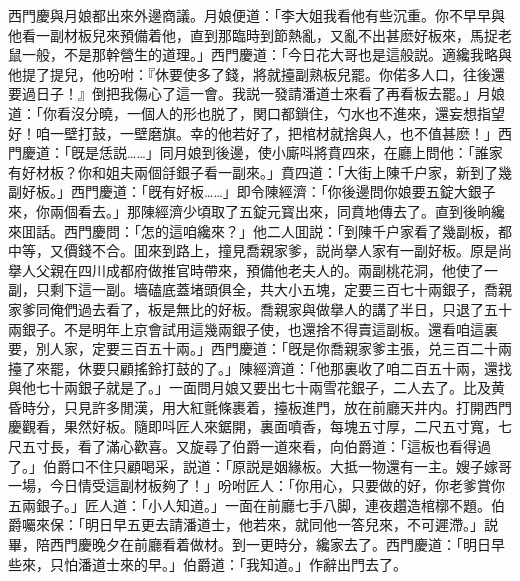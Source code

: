 西門慶與月娘都出來外邊商議。月娘便道：「李大姐我看他有些沉重。你不早早與他看一副材板兒來預備着他，直到那臨時到節熱亂，又亂不出甚麽好板來，馬捉老鼠一般，不是那幹營生的道理。」西門慶道：「今日花大哥也是這般説。適纔我略與他提了提兒，他吩咐：『休要使多了錢，將就擡副熟板兒罷。你偌多人口，往後還要過日子！』倒把我傷心了這一會。我説一發請潘道士來看了再看板去罷。」月娘道：「你看沒分曉，一個人的形也脱了，関口都鎖住，勺水也不進來，還妄想指望好！咱一壁打鼓，一壁磨旗。幸的他若好了，把棺材就捨與人，也不值甚麽！」西門慶道：「旣是恁説……」同月娘到後邊，使小廝呌將賁四來，在廳上問他：「誰家有好材板？你和姐夫兩個㧱銀子看一副來。」賁四道：「大街上陳千户家，新到了幾副好板。」西門慶道：「旣有好板……」即令陳經濟：「你後邊問你娘要五錠大銀子來，你兩個看去。」那陳經濟少頃取了五錠元寳出來，同賁地傳去了。直到後晌纔來囬話。西門慶問：「怎的這咱纔來？」他二人囬説：「到陳千户家看了幾副板，都中等，又價錢不合。囬來到路上，撞見喬親家爹，説尚擧人家有一副好板。原是尚擧人父親在四川成都府做推官時帶來，預備他老夫人的。兩副桃花洞，他使了一副，只剩下這一副。墻磕底蓋堵頭俱全，共大小五塊，定要三百七十兩銀子，喬親家爹同俺們過去看了，板是無比的好板。喬親家與做擧人的講了半日，只退了五十兩銀子。不是明年上京會試用這幾兩銀子使，也還捨不得賣這副板。還看咱這裏要，別人家，定要三百五十兩。」西門慶道：「旣是你喬親家爹主張，兑三百二十兩擡了來罷，休要只顧搖鈴打鼓的了。」陳經濟道：「他那裏收了咱二百五十兩，還找與他七十兩銀子就是了。」一面問月娘又要出七十兩雪花銀子，二人去了。比及黄昏時分，只見許多閒漢，用大紅氈條裹着，擡板進門，放在前廳天井内。打開西門慶觀看，果然好板。隨即呌匠人來鋸開，裏面噴香，每塊五寸厚，二尺五寸寬，七尺五寸長，看了滿心歡喜。又旋尋了伯爵一道來看，向伯爵道：「這板也看得過了。」伯爵口不住只顧喝采，説道：「原説是姻緣板。大抵一物還有一主。嫂子嫁哥一場，今日情受這副材板夠了！」吩咐匠人：「你用心，只要做的好，你老爹賞你五兩銀子。」匠人道：「小人知道。」一面在前廳七手八脚，連夜趲造棺槨不題。伯爵囑來保：「明日早五更去請潘道士，他若來，就同他一答兒來，不可遲滯。」説畢，陪西門慶晚夕在前廳看着做材。到一更時分，纔家去了。西門慶道：「明日早些來，只怕潘道士來的早。」伯爵道：「我知道。」作辭出門去了。

